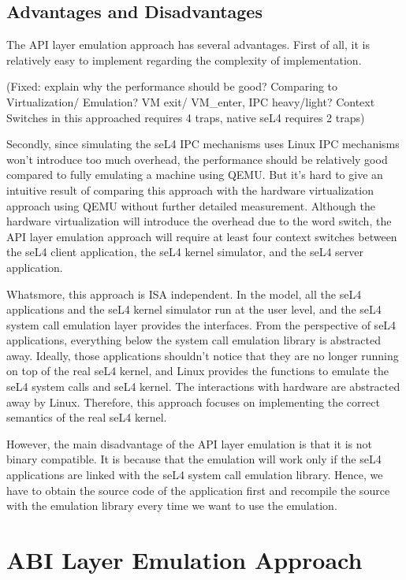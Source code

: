 \subsection{Advantages and Disadvantages}

The API layer emulation approach has several advantages. First of all, it is relatively easy to implement regarding the complexity of implementation.

(Fixed: explain why the performance should be good? Comparing to Virtualization/ Emulation? VM exit/ VM_enter, IPC heavy/light? Context Switches in this approached requires 4 traps, native seL4 requires 2 traps) 

Secondly, since simulating the seL4 IPC mechanisms uses Linux IPC mechanisms won't introduce too much overhead, the performance should be relatively good compared to fully emulating a machine using QEMU. But it's hard to give an intuitive result of comparing this approach with the hardware virtualization approach using QEMU without further detailed measurement. Although the hardware virtualization will introduce the overhead due to the word switch, the API layer emulation approach will require at least four context switches between the seL4 client application, the seL4 kernel simulator, and the seL4 server application.

Whatsmore, this approach is ISA independent. In the model, all the seL4 applications and the seL4 kernel simulator run at the user level, and the seL4 system call emulation layer provides the interfaces. From the perspective of seL4 applications, everything below the system call emulation library is abstracted away. Ideally, those applications shouldn't notice that they are no longer running on top of the real seL4 kernel, and Linux provides the functions to emulate the seL4 system calls and seL4 kernel. The interactions with hardware are abstracted away by Linux. Therefore, this approach focuses on implementing the correct semantics of the real seL4 kernel.

However, the main disadvantage of the API layer emulation is that it is not binary compatible. It is because that the emulation will work only if the seL4 applications are linked with the seL4 system call emulation library. Hence, we have to obtain the source code of the application first and recompile the source with the emulation library every time we want to use the emulation.    

\section{ABI Layer Emulation Approach}

